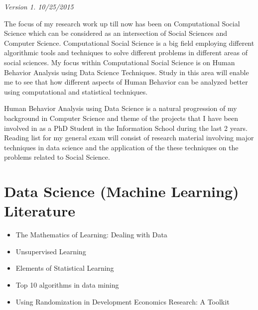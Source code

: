 \textit{Version 1. 10/25/2015} 

The focus of my research work up till now has been on Computational Social Science which can be considered as an intersection of Social Sciences and Computer Science. Computational Social Science is a big field employing different algorithmic tools and techniques to solve different problems in different areas of social sciences. My focus within Computational Social Science is on Human Behavior Analysis using Data Science Techniques. Study in this area will enable me to see that how different aspects of Human Behavior can be analyzed better using computational and statistical techniques.

Human Behavior Analysis using Data Science is a natural progression of my background in Computer Science and theme of the projects that I have been involved in as a PhD Student in the Information School during the last 2 years. Reading list for my general exam will consist of research material involving major techniques in data science and the application of the these techniques on the problems related to Social Science. 

\section{Data Science (Machine Learning) Literature}
\begin{itemize}
\item The Mathematics of Learning: Dealing with Data\cite{Poggio_2005}
\end{itemize}
\begin{itemize}
\item Unsupervised Learning \cite{Ghahramani_2004}
\end{itemize}
\begin{itemize}
\item Elements of Statistical Learning\cite{2009}
\end{itemize}
\begin{itemize}
\item Top 10 algorithms in data mining \cite{2009}
\end{itemize}
\begin{itemize}
\item Using Randomization in Development Economics Research: A Toolkit \cite{Duflo} 
\end{itemize}

